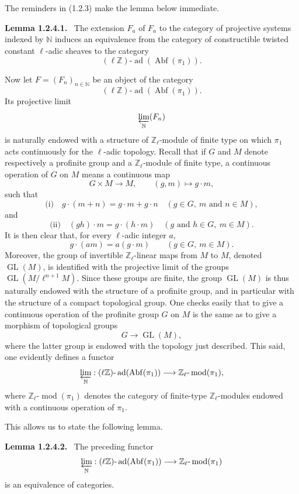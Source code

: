 \documentclass[11pt]{article}
\newenvironment{statement}[1]{\par\medskip\noindent\textbf{#1.}\ }{\par\medskip}
\providecommand{\Abf}{\operatorname{Abf}}
\providecommand{\GL}{\operatorname{GL}}
\providecommand{\ad}{\operatorname{ad}}
\providecommand{\modn}{\operatorname{mod}}
\begin{document}
The reminders in (1.2.3) make the lemma below immediate.

\begin{statement}{Lemma 1.2.4.1}
The extension \(\widehat F_a\) of \(F_a\) to the category of projective systems indexed by \(\mathbb N\) induces an equivalence from the category of constructible twisted constant \(\ell\)-adic sheaves to the category
\[
(\ell\mathbb Z)\text{-}\ad(\Abf(\pi_1)).
\]
\end{statement}

Now let \(F=(F_n)_{n\in\mathbb N}\) be an object of the category
\[
(\ell\mathbb Z)\text{-}\ad(\Abf(\pi_1)).
\]
Its projective limit
\[
\varprojlim_{\mathbb N}(F_n)
\]
is naturally endowed with a structure of \(\mathbb Z_\ell\)-module of finite type on which \(\pi_1\) acts continuously for the \(\ell\)-adic topology. Recall that if \(G\) and \(M\) denote respectively a profinite group and a \(\mathbb Z_\ell\)-module of finite type, a continuous operation of \(G\) on \(M\) means a continuous map
\[
G\times M\longrightarrow M,\qquad (g,m)\longmapsto g\cdot m,
\]
such that
\[
\text{(i)}\quad g\cdot(m+n)=g\cdot m+g\cdot n\quad (g\in G,\ m\text{ and }n\in M),
\]
and
\[
\text{(ii)}\quad (gh)\cdot m=g\cdot(h\cdot m)\quad (g\text{ and }h\in G,\ m\in M).
\]
It is then clear that, for every \(\ell\)-adic integer \(a\),
\[
g\cdot(am)=a(g\cdot m)\qquad (g\in G,\ m\in M).
\]
Moreover, the group of invertible \(\mathbb Z_\ell\)-linear maps from \(M\) to \(M\), denoted \(\GL(M)\), is identified with the projective limit of the groups \(\GL(M/\ell^{n+1}M)\). Since these groups are finite, the group \(\GL(M)\) is thus naturally endowed with the structure of a profinite group, and in particular with the structure of a compact topological group. One checks easily that to give a continuous operation of the profinite group \(G\) on \(M\) is the same as to give a morphism of topological groups
\[
G\longrightarrow \GL(M),
\]
where the latter group is endowed with the topology just described. This said, one evidently defines a functor
\[
\varprojlim_{\mathbb N}:(\ell\mathbb Z)\text{-}\ad(\Abf(\pi_1))\longrightarrow
\mathbb Z_\ell\text{-}\modn(\pi_1),
\]
where \(\mathbb Z_\ell\text{-}\modn(\pi_1)\) denotes the category of finite-type \(\mathbb Z_\ell\)-modules endowed with a continuous operation of \(\pi_1\).

This allows us to state the following lemma.

\begin{statement}{Lemma 1.2.4.2}
The preceding functor
\[
\varprojlim_{\mathbb N}:(\ell\mathbb Z)\text{-}\ad(\Abf(\pi_1))
\longrightarrow \mathbb Z_\ell\text{-}\modn(\pi_1)
\]
is an equivalence of categories.
\end{statement}
\end{document}
